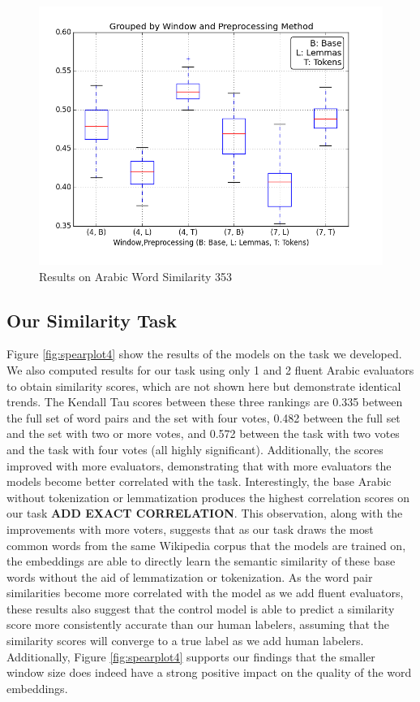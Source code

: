 \begin{figure}
  \includegraphics[width=\linewidth]{results_spearman/ar_similiarity_task_results_ws353_spearplot.png}
  \caption{Results on Arabic Word Similarity 353}
  \label{fig:spearplotws353}
\end{figure}

\subsection{Our Similarity Task}

Figure \ref{fig:spearplot4} show the results of the models on the task we developed. We also computed results for our task using only 1 and 2 fluent Arabic evaluators to obtain similarity scores, which are not shown here but demonstrate identical trends. The Kendall Tau scores between these three rankings are 0.335 between the full set of word pairs and the set with four votes, 0.482 between the full set and the set with two or more votes, and 0.572 between the task with two votes and the task with four votes (all highly significant). Additionally, the scores improved with more evaluators, demonstrating that with more evaluators the models become better correlated with the task. Interestingly, the base Arabic without tokenization or lemmatization produces the highest correlation scores on our task \textbf{ADD EXACT CORRELATION}. This observation, along with the improvements with more voters, suggests that as our task draws the most common words from the same Wikipedia corpus that the models are trained on, the embeddings are able to directly learn the semantic similarity of these base words without the aid of lemmatization or tokenization. As the word pair similarities become more correlated with the model as we add fluent evaluators, these results also suggest that the control model is able to predict a similarity score more consistently accurate than our human labelers, assuming that the similarity scores will converge to a true label as we add human labelers. Additionally, Figure \ref{fig:spearplot4} supports our findings that the smaller window size does indeed have a strong positive impact on the quality of the word embeddings.

